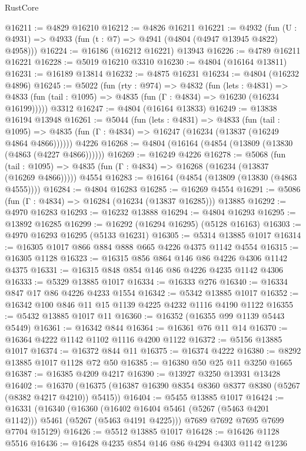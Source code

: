 \begin{lexlean}{RustCore}
\begin{coremodule}
@16211 := @4829 @16210
@16212 := @4826 @16211
@16221 := @4932
    (fun (U : @4931) => @4933 (fun (t : @7) => @4941 (@4804 (@4947 @13945 @4822) @4958)))
@16224 := @16186 (@16212 @16221) @13943
@16226 := @4789 @16211 @16221
@16228 := @5019 @16210 @3310
@16230 := @4804 (@16164 @13811)
@16231 := @16189 @13814
@16232 := @4875 @16231
@16234 := @4804 (@16232 @4896)
@16245 := @5022
    (fun (rty : @974) =>
    @4832
      (fun (lets : @4831) =>
      @4833 (fun (tail : @1095) => @4835 (fun (Γ : @4834) => @16230 (@16234 @16199)))))
    @3312
@16247 := @4804 (@16164 @13833)
@16249 := @13838 @16194 @13948
@16261 := @5044
    (fun (lets : @4831) =>
    @4833
      (fun (tail : @1095) =>
      @4835 (fun (Γ : @4834) => @16247 (@16234 (@13837 (@16249 @4864 @4866))))))
    @4226
@16268 := @4804 (@16164 (@4854 (@13809 (@13830 (@4863 (@4227 @4866))))))
@16269 := @16249 @4226
@16278 := @5068
    (fun (tail : @1095) => @4835 (fun (Γ : @4834) => @16268 (@16234 (@13837 (@16269 @4866)))))
    @4554
@16283 := @16164 (@4854 (@13809 (@13830 (@4863 @4555))))
@16284 := @4804 @16283
@16285 := @16269 @4554
@16291 := @5086 (fun (Γ : @4834) => @16284 (@16234 (@13837 @16285))) @13885
@16292 := @4970 @16283
@16293 := @16232 @13888
@16294 := @4804 @16293
@16295 := @13892 @16285
@16299 := @16292 (@16294 @16295) (@5128 @16163)
@16303 := @4970 @16293 @16295 (@5133 @16231)
@16305 := @5314 @13885 @1017
@16314 := @16305 @1017 @866 @884 @888 @665 @4226 @4375 @1142 @4554
@16315 := @16305 @1128
@16323 := @16315 @856 @864 @146 @86 @4226 @4306 @1142 @4375
@16331 := @16315 @848 @854 @146 @86 @4226 @4235 @1142 @4306
@16333 := @5329 @13885 @1017
@16334 := @16333 @276
@16340 := @16334 @847 @17 @86 @4226 @4233 @1554
@16342 := @5342 @13885 @1017
@16352 := @16342 @100 @846 @11 @15 @1139 @4225 @4232 @1116 @4190 @1122
@16355 := @5432 @13885 @1017 @11
@16360 := @16352 (@16355 @99 @1139 @5443 @5449)
@16361 := @16342 @844
@16364 := @16361 @76 @11 @14
@16370 := @16364 @4222 @1142 @1102 @1116 @4200 @1122
@16372 := @5156 @13885 @1017
@16374 := @16372 @844 @11
@16375 := @16374 @4222
@16380 := @8292 @13885 @1017 @1128 @72 @50
@16385 := @16380 @50 @25 @11 @3250 @1665
@16387 := @16385 @4209 @4217
@16390 := @13927 @3250 @13931 @13428
@16402 := @16370 (@16375 (@16387 @16390 @8354 @8360 @8377 @8380 (@5267 (@8382 @4217 @4210)) @5415))
@16404 := @5455 @13885 @1017
@16424 := @16331
    (@16340
      (@16360 (@16402 @16404 @5461 (@5267 (@5463 @4201 @1142))) @5461 (@5267 (@5463 @4191 @4225)))
      @7689
      @7692
      @7695
      @7699
      @7704
      @15129)
@16426 := @5512 @13885 @1017
@16428 := @16426 @1128 @5516
@16436 := @16428 @4235 @854 @146 @86 @4294 @4303 @1142 @1236

\end{coremodule}
\end{lexlean}
